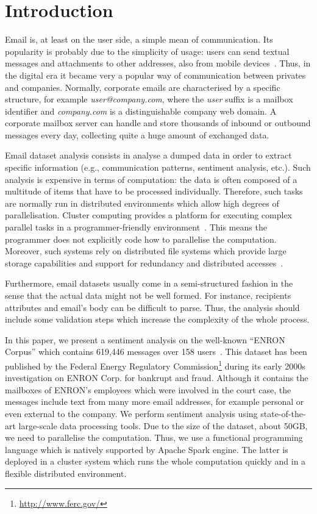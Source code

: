 \documentclass{vldb}
\begin{document}
\section{Introduction}
Email is, at least on the user side, a simple mean of communication.
Its popularity is probably due to the simplicity of usage: users can send textual messages and attachments to other addresses, also from mobile devices~\cite{chen2002enterprise}.   
Thus, in the digital era it became very a popular way of communication between privates and companies.
Normally, corporate emails are characterised by a specific structure, for example \textit{user@company.com}, where the \textit{user} suffix is a mailbox identifier and \textit{company.com} is a distinguishable company web domain.
A corporate mailbox server can handle and store thousands of inbound or outbound messages every day, collecting quite a huge amount of exchanged data.

Email dataset analysis consists in analyse a dumped data in order to extract specific information (e.g., communication patterns, sentiment analysis, etc.).
Such analysis is expensive in terms of computation: the data is often composed of a multitude of items that have to be processed individually.
Therefore, such tasks are normally run in distributed environments which allow high degrees of parallelisation.
Cluster computing provides a platform for executing complex parallel tasks in a programmer-friendly environment~\cite{buyya1999high, zaharia2010spark, shvachko2010hadoop}.
This means the programmer does not explicitly code how to parallelise the computation.
Moreover, such systems rely on distributed file systems which provide large storage capabilities and support for redundancy and distributed accesses~\cite{weil2006ceph}.

Furthermore, email datasets usually come in a semi-structured fashion in the sense that the actual data might not be well formed. 
For instance, recipients attributes and email's body can be difficult to parse.
Thus, the analysis should include some validation steps which increase the complexity of the whole process.

In this paper, we present a sentiment analysis on the well-known ``ENRON Corpus'' which contains 619,446 messages over 158 users~\cite{shetty2004enron}.
This dataset has been published by the Federal Energy Regulatory Commission\footnote{\url{http://www.ferc.gov/}} during its early 2000s investigation on ENRON Corp. for bankrupt and fraud.
Although it contains the mailboxes of ENRON's employees which were involved in the court case, the messages include text from many more email addresses, for example personal or even external to the company.
We perform sentiment analysis using state-of-the-art large-scale data processing tools.
Due to the size of the dataset, about 50GB, we need to parallelise the computation.
Thus, we use a functional programming language which is natively supported by Apache Spark engine.
The latter is deployed in a cluster system which runs the whole computation quickly and in a flexible distributed environment.
\end{document}
